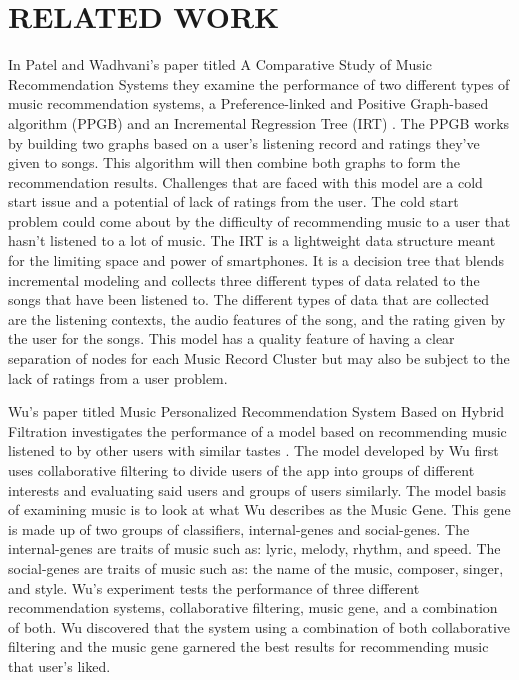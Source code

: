 \documentclass[letterpaper, 10 pt, conference]{ieeeconf}
\begin{document}
\section{RELATED WORK}
In Patel and Wadhvani’s paper titled A Comparative Study of Music Recommendation Systems they examine the performance of two different types of music recommendation systems, a Preference-linked and Positive Graph-based algorithm (PPGB) and an Incremental Regression Tree (IRT) \cite{two}. The PPGB works by building two graphs based on a user’s listening record and ratings they’ve given to songs. This algorithm will then combine both graphs to form the recommendation results. Challenges that are faced with this model are a cold start issue and a potential of lack of ratings from the user. The cold start problem could come about by the difficulty of recommending music to a user that hasn’t listened to a lot of music. The IRT is a lightweight data structure meant for the limiting space and power of smartphones. It is a decision tree that blends incremental modeling and collects three different types of data related to the songs that have been listened to. The different types of data that are collected are the listening contexts, the audio features of the song, and the rating given by the user for the songs. This model has a quality feature of having a clear separation of nodes for each Music Record Cluster but may also be subject to the lack of ratings from a user problem.

Wu’s paper titled Music Personalized Recommendation System Based on Hybrid Filtration investigates the performance of a model based on recommending music listened to by other users with similar tastes \cite{three}. The model developed by Wu first uses collaborative filtering to divide users of the app into groups of different interests and evaluating said users and groups of users similarly. The model basis of examining music is to look at what Wu describes as the Music Gene. This gene is made up of two groups of classifiers, internal-genes and social-genes. The internal-genes are traits of music such as: lyric, melody, rhythm, and speed. The social-genes are traits of music such as: the name of the music, composer, singer, and style. Wu’s experiment tests the performance of three different recommendation systems, collaborative filtering, music gene, and a combination of both. Wu discovered that the system using a combination of both collaborative filtering and the music gene garnered the best results for recommending music that user’s liked.
\end{document}

